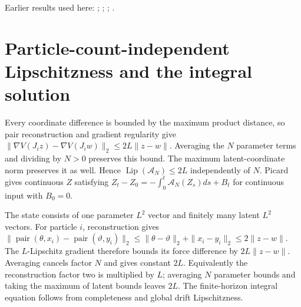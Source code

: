 \documentclass[11pt,a4paper]{article}
\begin{document}
Earlier results used here: \cite[Section~3.13.2]{LangevinLean2026ULASC}; \cite[Section~3.13.3]{LangevinLean2026ULASC}; \cite[Section~3.1.1]{LangevinLean2026IPLA}; \cite[Section~3.3.1]{LangevinLean2026IPLA}.

\section{\texorpdfstring{Particle-count-independent Lipschitzness and the integral solution}{Particle-count-independent Lipschitzness and the integral solution}}


Every coordinate difference is bounded by the maximum product distance, so pair reconstruction and gradient regularity give \(\|\nabla V(J_i z)-\nabla V(J_i w)\|_2\le2L\|z-w\|\). Averaging the \(N\) parameter terms and dividing by \(N>0\) preserves this bound. The maximum latent-coordinate norm preserves it as well. Hence \(\operatorname{Lip}(\mathcal A_N)\le2L\) independently of \(N\). Picard gives continuous \(Z\) satisfying \(Z_t-Z_0=-\int_0^t\mathcal A_N(Z_s)ds+B_t\) for continuous input with \(B_0=0\).



The state consists of one parameter \(L^2\) vector and finitely many latent \(L^2\) vectors. For particle \(i\), reconstruction gives \(\|\operatorname{pair}(\theta,x_i)-\operatorname{pair}(\vartheta,y_i)\|_2\le\|\theta-\vartheta\|_2+\|x_i-y_i\|_2\le2\|z-w\|\). The \(L\)-Lipschitz gradient therefore bounds its force difference by \(2L\|z-w\|\). Averaging cancels factor \(N\) and gives constant \(2L\). Equivalently the reconstruction factor two is multiplied by \(L\); averaging \(N\) parameter bounds and taking the maximum of latent bounds leaves \(2L\). The finite-horizon integral equation follows from completeness and global drift Lipschitzness.
\end{document}
